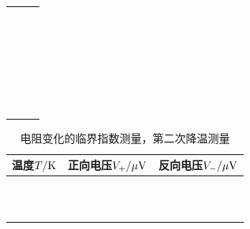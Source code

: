 \documentclass[11pt,a4paper]{ctexart}
\begin{document}
\begin{enumerate}
\begin{table}[H]
\begin{tabular}{|p{32mm}|p{32mm}|p{32mm}|}
 & & \\ \hline
  & & \\ \hline
  & & \\ \hline
   & & \\ \hline
    & & \\ \hline
 & & \\ \hline
  &  &\\ \hline
  &  &\\ \hline
  &  &\\ \hline
  &  &\\ \hline
  &  &\\ \hline
  &  &\\ \hline
  &  &\\ \hline
  &  &\\ \hline
  &  &\\ \hline
  &  &\\ \hline
  &  &\\ \hline
  &  &\\ \hline
    & &\\ \hline
  & &\\ \hline
   & &\\ \hline
     &  &\\ \hline
  &  &\\ \hline
  &  &\\ \hline
  &  &\\ \hline
    & &\\ \hline
  & &\\ \hline
   & &\\ \hline
  \end{tabular}
  \end{table}
\begin{table}[H]
\centering
\caption{电阻变化的临界指数测量\label{tableex4}，第二次降温测量}
\begin{tabular}{|p{32mm}|p{32mm}|p{32mm}|}
\hline
温度$T/{\rm K}$ & 正向电压$V_+/{\rm \mu V}$ & 反向电压$V_-/{\rm \mu V}$ \\ \hline
 & & \\ \hline
  & & \\ \hline
  & & \\ \hline
   & & \\ \hline
    & & \\ \hline
 & & \\ \hline
  &  &\\ \hline
  &  &\\ \hline
  &  &\\ \hline
  &  &\\ \hline
  &  &\\ \hline

\end{tabular}
\end{table}
\end{enumerate}
\end{document}
